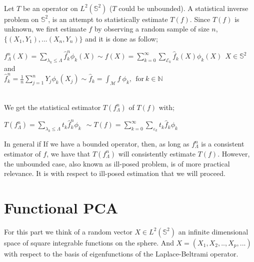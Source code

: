 \documentclass[a0,landscape]{a0poster}
\begin{document}
\begin{multicols}{4}
\noindent {}\\
 Let $T$ be an operator on $L^2 (\mathbb{S}^2)$ ($T$ could be unbounded). A statistical inverse problem on $\mathbb{S}^2$, is an attempt to statistically estimate $T(f)$. Since $T(f)$ is unknown, we first  estimate $f$  by observing a random sample of size $n$, $\{(X_1, Y_1),...(X_n, Y_n)\}$ and it is done as follow;\\

\begin{center}
$f_{\Lambda}^{n}(X)= \sum_{\lambda_k \leq \Lambda} \hat{f}^{n}_{k} \phi_{k}(X) \sim f(X) = \sum_{k=0}^{\infty}\sum_{\mathcal{E}_{k}} \hat{f}_{k}(X) \phi_{k}(X)~~ X \in \mathbb{S}^2$
and\\
$\hat{f}^{n}_{k}= \frac{1}{n} \sum_{j=1}^{n} Y_j {\phi}_k ( X_j) \sim \hat{f}_{k}= \int_{\mathcal{M}} f~ {\phi}_k , ~~\text{for}~k \in \mathbb{N} $
\end{center}

 \bigskip

\noindent {}\\
We get the statistical estimator $T(f_{\Lambda}^{n})$ of $T(f)$ with;

\begin{center}
$T(f^{n}_{\Lambda})= \sum_{\lambda_{k} \leq \Lambda} t_{k} \hat{f}^{n}_{k} \phi_{k} ~~\sim  T(f)= \sum_{k=0}^{\infty} \sum_{\varepsilon_k} t_k  \hat{f}_{k} \phi_{k}$
\end{center}



\noindent \textbullet In general if If we have a bounded operator, then, as long as $f_{\Lambda}^{n}$ is a consistent estimator of $f$, we have that $T(f_{\Lambda}^{n})$ will consistently estimate $T(f)$.
However, the unbounded case, also known as ill-posed problem, is of more practical relevance. It is with respect to ill-posed estimation that we will proceed.



%	

\section*{\color{red}Functional PCA}

\noindent \textbullet For this part we think of a random vector $X\in L^{2}(\mathbb{S}^2)$ an infinite dimensional space of square integrable functions on the sphere. And $X= (X_1, X_2,.., X_p, ...)$ with respect to the basis of eigenfunctions of the Laplace-Beltrami operator.\\


\end{multicols}
\end{document}
